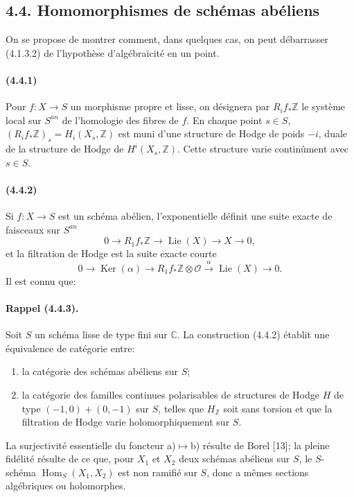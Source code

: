 \documentclass[10pt]{article}
\newcommand{\C}{\mathbb C}
\newcommand{\Z}{\mathbb Z}
\newcommand{\Ker}{\operatorname{Ker}}
\newcommand{\Hom}{\operatorname{Hom}}
\providecommand{\Lie}{\operatorname{Lie}}
\providecommand{\cO}{\mathcal O}
\providecommand{\cO}{\mathcal O}
\begin{document}
\subsection*{4.4. Homomorphismes de schémas abéliens}

On se propose de montrer comment, dans quelques cas, on peut débarrasser (4.1.3.2) de l'hypothèse d'algébraïcité en un point.

\paragraph{(4.4.1)} Pour $f:X\to S$ un morphisme propre et lisse, on désignera par $R_if_*\Z$ le système local sur $S^{an}$ de l'homologie des fibres de $f$. En chaque point $s\in S$, $(R_if_*\Z)_s=H_i(X_s,\Z)$ est muni d'une structure de Hodge de poids $-i$, duale de la structure de Hodge de $H^i(X_s,\Z)$. Cette structure varie continûment avec $s\in S$.

\paragraph{(4.4.2)} Si $f:X\to S$ est un schéma abélien, l'exponentielle définit une suite exacte de faisceaux sur $S^{an}$
\[
0\to R_1f_*\Z\to\Lie(X)\to X\to0,
\]
et la filtration de Hodge est la suite exacte courte
\[
0\to\Ker(\alpha)\to R_1f_*\Z\otimes\cO\xrightarrow{\alpha}\Lie(X)\to0.
\]
Il est connu que:

\paragraph{Rappel (4.4.3).} Soit $S$ un schéma lisse de type fini sur $\C$. La construction (4.4.2) établit une équivalence de catégorie entre:
\begin{enumerate}[label=\alph*)]
\item la catégorie des schémas abéliens sur $S$;
\item la catégorie des familles continues polarisables de structures de Hodge $H$ de type $(-1,0)+(0,-1)$ sur $S$, telles que $H_\Z$ soit sans torsion et que la filtration de Hodge varie holomorphiquement sur $S$.
\end{enumerate}
La surjectivité essentielle du foncteur a)$\mapsto$b) résulte de Borel [13]; la pleine fidélité résulte de ce que, pour $X_1$ et $X_2$ deux schémas abéliens sur $S$, le $S$-schéma $\Hom_S(X_1,X_2)$ est non ramifié sur $S$, donc a mêmes sections algébriques ou holomorphes.
\end{document}
